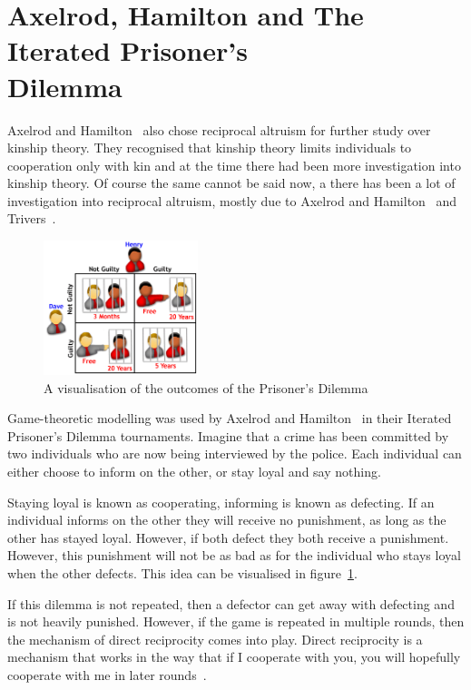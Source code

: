 \documentclass[]{final_report}
\begin{document}
\section{Axelrod, Hamilton and The Iterated Prisoner's\\ Dilemma}
\label{sec:ipd}
Axelrod and Hamilton~\cite{evolution_of_cooperation} also chose reciprocal altruism for further study over kinship theory. They recognised that kinship theory limits individuals to cooperation only with kin and at the time there had been more investigation into kinship theory. Of course the same cannot be said now, a there has been a lot of investigation into reciprocal altruism, mostly due to Axelrod and Hamilton~\cite{evolution_of_cooperation} and Trivers~\cite{trivers1971evolution}.
\begin{figure}
	\center
	\includegraphics[width=0.4\textwidth]{LaymansIPD.png}
	\caption{A visualisation of the outcomes of the Prisoner's Dilemma~\cite{laymansipd}}
	\label{fig:ipdvis}
\end{figure}
\par
Game-theoretic modelling was used by Axelrod and Hamilton~\cite{evolution_of_cooperation} in their Iterated Prisoner's Dilemma tournaments. Imagine that a crime has been committed by two individuals who are now being interviewed by the police. Each individual can either choose to inform on the other, or stay loyal and say nothing.\par
Staying loyal is known as cooperating, informing is known as defecting. If an individual informs on the other they will receive no punishment, as long as the other has stayed loyal. However, if both defect they both receive a punishment. However, this punishment will not be as bad as for the individual who stays loyal when the other defects. This idea can be visualised in figure~\ref{fig:ipdvis}.\par
If this dilemma is not repeated, then a defector can get away with defecting and is not heavily punished. However, if the game is repeated in multiple rounds, then the mechanism of direct reciprocity comes into play. Direct reciprocity is a mechanism that works in the way that if I cooperate with you, you will hopefully cooperate with me in later rounds~\cite{five_rules_coop}.\par
\end{document}
